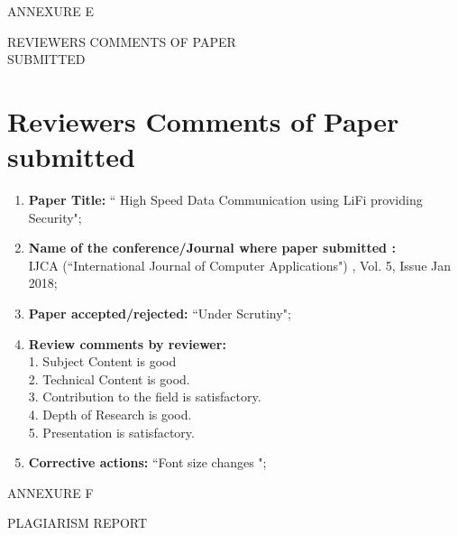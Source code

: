 \documentclass[12pt,a4paper]
{article}
\numberwithin{table}{section}
\begin{document}
{{{{{{{{{\begin{appendices}
\begin{minipage}{18cm}
\begin{center}
\begin{Huge}
ANNEXURE E

\vspace{0.5 in}
\setlength{\baselineskip}{1\baselineskip}
{
REVIEWERS COMMENTS OF PAPER \\ 
SUBMITTED\\
}
\end{Huge}

\end{center}
\end{minipage}

\newpage
\section{Reviewers Comments of Paper submitted}
\begin{enumerate}
\item \textbf{Paper Title:}  `` High Speed Data Communication using LiFi providing Security";
\item \textbf{Name of the conference/Journal where paper submitted :} \\ IJCA (``International Journal of Computer Applications")	, Vol. 5, Issue Jan 2018; \\
\item \textbf{Paper accepted/rejected:  } ``Under Scrutiny";
\\
\item \textbf{Review comments by reviewer:}\\
1. Subject Content is good \\
2. Technical Content is good.\\
3. Contribution to the field is satisfactory. \\
4. Depth of Research is good.\\
5. Presentation is satisfactory.\\
\item \textbf{Corrective actions:} ``Font size changes ";
\end{enumerate}
\newpage
\begin{minipage}{15cm}
\vspace{4 in}
 \begin{center} 
\begin{Huge}

ANNEXURE F

\vspace{0.5 in}
PLAGIARISM REPORT
\end{Huge}

\end{center}
\end{minipage}


\end{appendices}}}}}}}}}}
\end{document}
